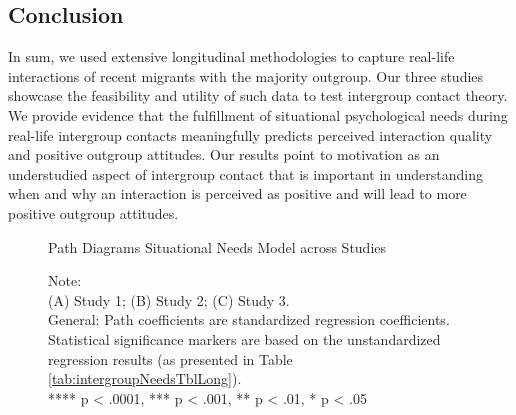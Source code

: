 \documentclass[man, 12pt, a4paper, mask]{apa7}
\theoremstyle{break}
\theoremstyle{plain}
\begin{document}
\subsection{Conclusion}
In sum, we used extensive longitudinal methodologies to capture real-life interactions of recent migrants with the majority outgroup. Our three studies showcase the feasibility and utility of such data to test intergroup contact theory. We provide evidence that the fulfillment of situational psychological needs during real-life intergroup contacts meaningfully predicts perceived interaction quality and positive outgroup attitudes. Our results point to motivation as an understudied aspect of intergroup contact that is important in understanding when and why an interaction is perceived as positive and will lead to more positive outgroup attitudes.








\begin{figure}
  \caption{Path Diagrams Situational Needs Model across Studies}
  \label{fig:MainPaths}
  \begin{center}
    
  \end{center}
  \caption*{Note: \\
  (A) Study 1; (B) Study 2; (C) Study 3.\\
  General: Path coefficients are standardized regression coefficients. Statistical significance markers are based on the unstandardized regression results (as presented in Table \ref{tab:intergroupNeedsTblLong}).\\
  **** p < .0001, *** p < .001, ** p < .01, * p < .05}
\end{figure}
\end{document}
